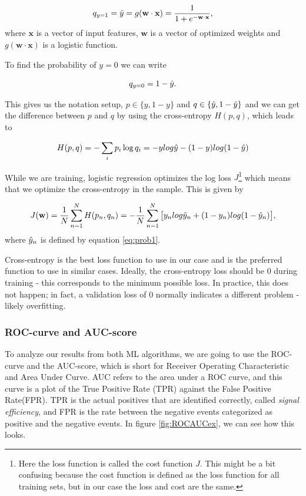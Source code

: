 \begin{equation}
    \label{eq:prob1}
    q_{y=1} = \Hat{y} = g(\textbf{w} \cdot \textbf{x}) = \frac{1}{1+e^{-\textbf{w} \cdot \textbf{x}}},
\end{equation}
where $\textbf{x}$ is a vector of input features, $\textbf{w}$ is a vector of optimized weights and $g(\textbf{w} \cdot \textbf{x})$ is a logistic function.

To find the probability of $y=0$ we can write

\begin{equation}
    \label{eq:prob0}
    q_{y=0} = 1- \Hat{y}.
\end{equation}

This gives us the notation setup, $p \in \{y, 1-y\}$ and $q \in \{\Hat{y}, 1-\Hat{y}\}$ and we can get the difference between $p$ and $q$ by using the cross-entropy $H(p,q)$, which leads to

\begin{equation}
    \label{eq:crossentropy}
    H(p,q) = - \sum_i p_i \log q_i = - y log \Hat{y} - (1-y) log(1-\Hat{y})
\end{equation}

While we are training, logistic regression optimizes the log loss $J$\footnote{Here the loss function is called the cost function $J$. This might be a bit confusing because the cost function is defined as the loss function for all training sets, but in our case the loss and cost are the same.} which means that we optimize the cross-entropy in the sample. This is given by

\begin{equation}
    \label{eq:loss}
    J(\textbf{w}) = \frac{1}{N} \sum_{n=1}^N H(p_n, q_n) = - \frac{1}{N} \sum_{n=1}^N \big[y_n log \Hat{y}_n + (1-y_n) log(1-\Hat{y}_n)\big],
\end{equation}
where $\Hat{y}_n$ is defined by equation \ref{eq:prob1}.

Cross-entropy is the best loss function to use in our case and is the preferred function to use in similar cases. Ideally, the cross-entropy loss should be 0 during training - this corresponds to the minimum possible loss. In practice, this does not happen; in fact, a validation loss of 0 normally indicates a different problem  - likely overfitting. 


\subsubsection{ROC-curve and AUC-score}
To analyze our results from both ML algorithms, we are going to use the ROC-curve and the AUC-score, which is short for Receiver Operating Characteristic and Area Under Curve. AUC refers to the area under a ROC curve, and this curve is a plot of the True Positive Rate (TPR) against the False Positive Rate(FPR). TPR is the actual positives that are identified correctly, called \textit{signal efficiency}, and FPR is the rate between the negative events categorized as positive and the negative events. In figure \ref{fig:ROCAUCex}, we can see how this looks. 

